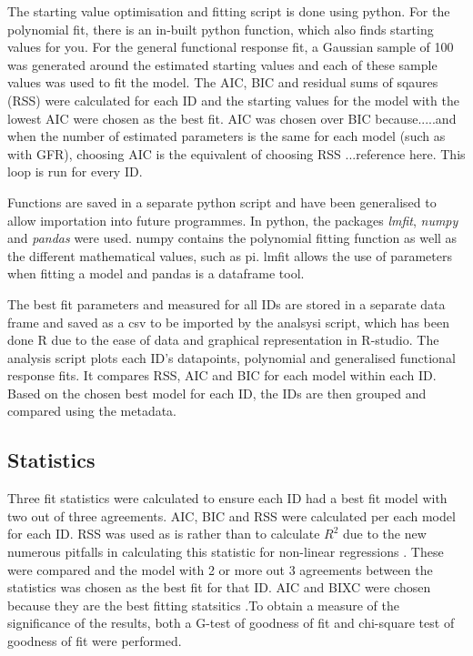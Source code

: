 \documentclass[11pt, a4paper, titlepage]{article}
\begin{document}
The starting value optimisation and fitting script is done using python. For the polynomial fit, there is an in-built python function, which also finds starting values for you. For the general functional response fit, a Gaussian sample of 100 was generated around the estimated starting values and each of these sample values was used to fit the model. The AIC, BIC and residual sums of sqaures (RSS) were calculated for each ID and the starting values for the model with the lowest AIC were chosen as the best fit. AIC was chosen over BIC because.....and when the number of estimated parameters is the same for each model (such as with GFR), choosing AIC is the equivalent of choosing RSS ...reference here. This loop is run for every ID.

Functions are saved in a separate python script and have been generalised to allow importation into future programmes. In python, the packages \textit{lmfit}, \textit{numpy} and \textit{pandas} were used. numpy contains the polynomial fitting function as well as the different mathematical values, such as pi. lmfit allows the use of parameters when fitting a model and pandas is a dataframe tool.

The best fit parameters and measured for all IDs are stored in a separate data frame and saved as a csv to be imported by the analsysi script, which has been done R due to the ease of data and graphical representation in R-studio. The analysis script plots each ID's datapoints, polynomial and generalised functional response fits. It compares RSS, AIC and BIC for each model within each ID. Based on the chosen best model for each ID, the IDs are then grouped and compared using the metadata.

\subsection{Statistics}

Three fit statistics were calculated to ensure each ID had a best fit model with two out of three agreements. AIC, BIC and RSS were calculated per each model for each ID. RSS was used as is rather than to calculate $R^{2}$ due to the new numerous pitfalls in calculating this statistic for non-linear regressions \parencite{kvalseth1985}. These were compared and the model with 2 or more out 3 agreements between the statistics was chosen as the best fit for that ID. AIC and BIXC were chosen because they are the best fitting statsitics \parencite{Johnson2004}.To obtain a measure of the significance of the results, both a G-test of goodness of fit and chi-square test of goodness of fit were performed.
\end{document}
